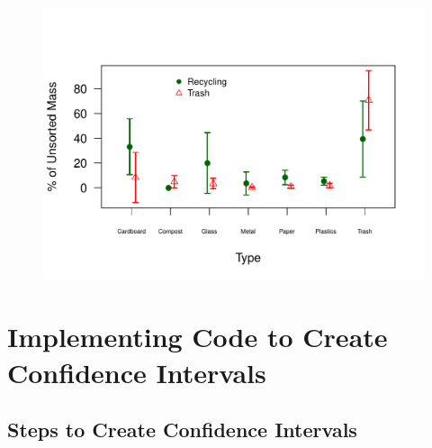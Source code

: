 \documentclass{tufte-handout}\usepackage[]{graphicx}\usepackage[]{color}
\makeatletter
\def\maxwidth{ %
  \ifdim\Gin@nat@width>\linewidth
    \linewidth
  \else
    \Gin@nat@width
  \fi
}
\newenvironment{kframe}{%
 \def\at@end@of@kframe{}%
 \ifinner\ifhmode%
  \def\at@end@of@kframe{\end{minipage}}%
  \begin{minipage}{\columnwidth}%
 \fi\fi%
 \def\FrameCommand##1{\hskip\@totalleftmargin \hskip-\fboxsep
 \colorbox{shadecolor}{##1}\hskip-\fboxsep
     \hskip-\linewidth \hskip-\@totalleftmargin \hskip\columnwidth}%
 \MakeFramed {\advance\hsize-\width
   \@totalleftmargin\z@ \linewidth\hsize
   \@setminipage}}%
 {\par\unskip\endMakeFramed%
 \at@end@of@kframe}
\newenvironment{knitrout}{}{} %
\makeatother
\begin{document}
\begin{figure}
\begin{knitrout}
\begin{kframe}
\begin{alltt}
\end{alltt}
\end{kframe}
\includegraphics[width=\maxwidth]{figure/unnamed-chunk-22-1} 

\end{knitrout}
\end{figure}


\section{Implementing Code to Create Confidence Intervals}

\subsection{Steps to Create Confidence Intervals}
\end{document}

